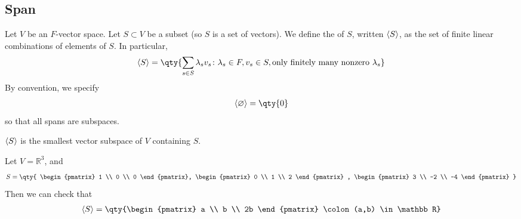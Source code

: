    \subsection{Span}
    \begin{definition}
        Let $V$ be an $F$-vector space.
        Let $S \subset V$ be a subset (so $S$ is a set of vectors).
        We define the  of $S$, written $\langle{} S \rangle$, as the set of finite linear combinations of elements of $S$.
        In particular,
        \begin{align*}
            \genset{S} = \qty{ \sum_{s \in S} \lambda_s v_s \colon \lambda_s \in F, v_s \in S, \text{only finitely many nonzero } \lambda_s }
        \end{align*}
        By convention, we specify
        \begin{align*}
            \genset{\varnothing} = \qty{0}
        \end{align*}
        so that all spans are subspaces.
    \end{definition}
    \begin{remark}
        $\langle{} S \rangle$ is the smallest vector subspace of $V$ containing $S$.
    \end{remark}
    \begin{example}
        Let $V = \mathbb R^3$, and
        \begin{align*}
            S = \qty{ \begin{pmatrix}
                    1 \\ 0 \\ 0
                \end{pmatrix}, \begin{pmatrix}
                    0 \\ 1 \\ 2
                \end{pmatrix} , \begin{pmatrix}
                3 \\ -2 \\ -4
            \end{pmatrix} }
        \end{align*}
        Then we can check that
        \begin{align*}
            \genset{S} = \qty{\begin{pmatrix}
                    a \\ b \\ 2b
                \end{pmatrix} \colon (a,b) \in \mathbb R}
        \end{align*}
    \end{example}
